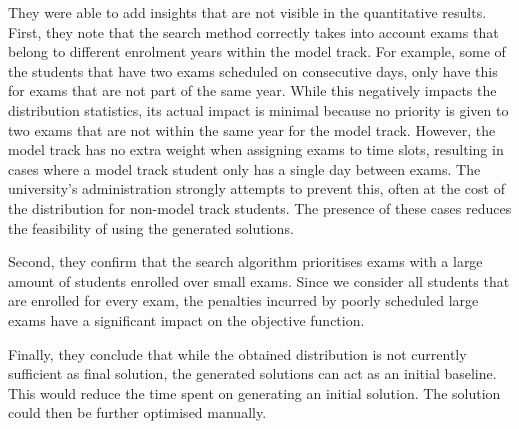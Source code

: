 They were able to add insights that are not visible in the quantitative results. First, they note that the search method correctly takes into account exams that belong to different enrolment years within the model track. For example, some of the students that have two exams scheduled on consecutive days, only have this for exams that are not part of the same year. While this negatively impacts the distribution statistics, its actual impact is minimal because no priority is given to two exams that are not within the same year for the model track. However, the model track has no extra weight when assigning exams to time slots, resulting in cases where a model track student only has a single day between exams. The university's administration strongly attempts to prevent this, often at the cost of the distribution for non-model track students. The presence of these cases reduces the feasibility of using the generated solutions.

Second, they confirm that the search algorithm prioritises exams with a large amount of students enrolled over small exams. Since we consider all students that are enrolled for every exam, the penalties incurred by poorly scheduled large exams have a significant impact on the objective function. 

Finally, they conclude that while the obtained distribution is not currently sufficient as final solution, the generated solutions can act as an initial baseline. This would reduce the time spent on generating an initial solution. The solution could then be further optimised manually.


